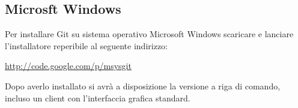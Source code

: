 \subsection{Microsft Windows}
Per installare Git su sistema operativo Microsoft Windows scaricare e lanciare l'installatore reperibile al seguente indirizzo:

\begin{center}
\url{http://code.google.com/p/msysgit}
\end{center}

Dopo averlo installato si avrà a disposizione la versione a riga di comando, incluso un client con l'interfaccia grafica standard.
